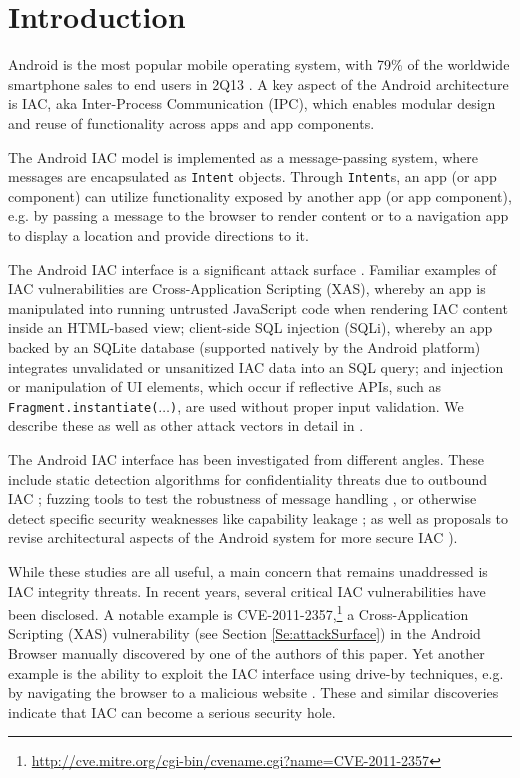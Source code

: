 \section{Introduction}\label{Se:introduction}

Android is the most popular mobile operating system, with 79\% of the worldwide smartphone sales to end users in 2Q13 \cite{gartner-android-share}. A key aspect of the Android architecture is IAC, aka Inter-Process Communication (IPC), which enables modular design and reuse of functionality across apps and app components.

The Android IAC model is implemented as a message-passing system, where messages are encapsulated as {\tt Intent} objects. Through {\tt Intent}s, an app (or app component) can utilize functionality exposed by another app (or app component), e.g. by passing a message to the browser to render content or to a navigation app to display a location and provide directions to it. 

The Android IAC interface is a significant attack surface \cite{CPGW:MOBISYS11,MAB:DSN12,EOM:SP09}. Familiar examples of IAC vulnerabilities are Cross-Application Scripting (XAS), whereby an app is manipulated into running untrusted JavaScript code when rendering IAC content inside an HTML-based view; client-side SQL injection (SQLi), whereby an app backed by an SQLite database (supported natively by the Android platform) integrates unvalidated or unsanitized IAC data into an SQL query; and injection or manipulation of UI elements, which occur if reflective APIs, such as {\tt Fragment.instantiate($\ldots$)}, are used without proper input validation. We describe these as well as other attack vectors in detail in . 

 The Android IAC interface has been investigated from different angles. These include static detection algorithms for confidentiality threats due to outbound IAC \cite{EOM:SP09}; fuzzing tools to test the robustness of message handling \cite{MAB:DSN12}, or otherwise detect specific security weaknesses like capability leakage \cite{YZWZD:ACCS14}; as well as proposals to revise architectural aspects of the Android system for more secure IAC \cite{KCHW:SPSM12}).

While these studies are all useful, a main concern that remains unaddressed is IAC integrity threats. In recent years, several critical IAC vulnerabilities have been disclosed. A notable example is CVE-2011-2357,\footnote{\url{http://cve.mitre.org/cgi-bin/cvename.cgi?name=CVE-2011-2357}} a Cross-Application Scripting (XAS) vulnerability
(see Section \ref{Se:attackSurface}) in the Android Browser manually discovered by one of the authors of this paper. Yet another example is the ability to exploit the IAC interface using drive-by techniques, e.g. by navigating the browser to a malicious website \cite{T:driveby}. These and similar discoveries indicate that IAC can become a serious security hole.

